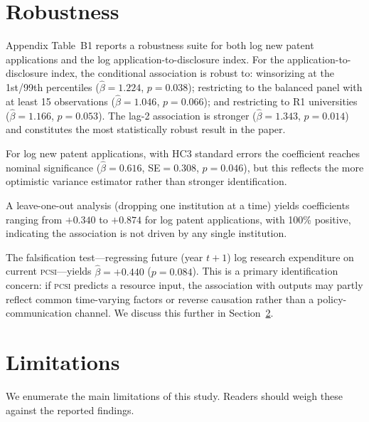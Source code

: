 \documentclass[12pt]{article}
\newcommand{\PCSI}{\textsc{pcsi}}
\begin{document}
\section{Robustness}
\label{sec:robustness}

Appendix Table~B1 reports a robustness suite for both log new patent applications and
the log application-to-disclosure index. For the application-to-disclosure index, the
conditional association is robust to: winsorizing at the 1st/99th percentiles
($\hat\beta=1.224$, $p=0.038$); restricting to the balanced panel with at least 15
observations ($\hat\beta=1.046$, $p=0.066$); and restricting to R1 universities
($\hat\beta=1.166$, $p=0.053$). The lag-2 association is stronger ($\hat\beta=1.343$,
$p=0.014$) and constitutes the most statistically robust result in the paper.

For log new patent applications, with HC3 standard errors the coefficient reaches
nominal significance ($\hat\beta=0.616$, SE$=0.308$, $p=0.046$), but this reflects
the more optimistic variance estimator rather than stronger identification.

A leave-one-out analysis (dropping one institution at a time) yields coefficients ranging
from $+0.340$ to $+0.874$ for log patent applications, with 100\% positive, indicating
the association is not driven by any single institution.

The falsification test---regressing future (year $t+1$) log research expenditure on
current \PCSI{}---yields $\hat\beta=+0.440$ ($p=0.084$). This is a primary identification
concern: if \PCSI{} predicts a resource input, the association with outputs may partly
reflect common time-varying factors or reverse causation rather than a policy-communication
channel. We discuss this further in Section~\ref{sec:limitations}.

\section{Limitations}
\label{sec:limitations}

We enumerate the main limitations of this study. Readers should weigh these against
the reported findings.
\end{document}
